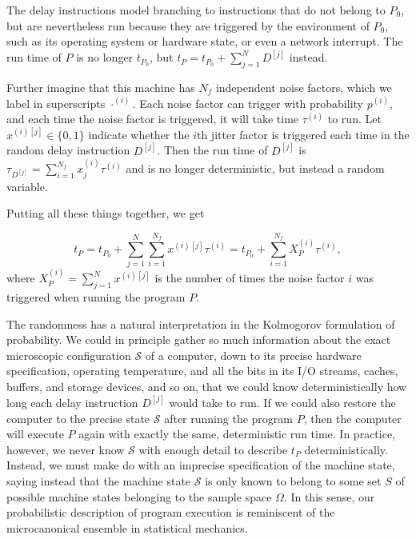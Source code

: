 \documentclass[conference]{IEEEtran}
\begin{document}
The delay instructions model branching to instructions that do not belong to $P_0$, but are nevertheless run because they are triggered by the environment of $P_0$, such as its operating system or hardware state, or even a network interrupt. The run time of $P$ is no longer $t_{P_0}$, but
$t_P = t_{P_0} + \sum_{j=1}^N D^{[j]}$ instead.

Further imagine that this machine has $N_f$ independent noise factors, which we label in superscripts $\cdot^{(i)}$. Each noise factor can trigger with probability $p^{(i)}$, and each time the noise factor is triggered, it will take time $\tau^{(i)}$ to run. Let $x^{(i)[j]} \in \{0, 1\}$ indicate whether the $i$th jitter factor is triggered each time in the random delay instruction $D^{[j]}$. Then the run time of $D^{[j]}$ is
$\tau_{D^{[j]}} = \sum_{i=1}^{N_f} x^{(i)}_j \tau^{(i)}$ and is no longer deterministic, but instead a random variable.

Putting all these things together, we get

\begin{equation}
t_P = t_{P_0} + \sum_{j=1}^N \sum_{i=1}^{N_f} x^{(i)[j]} \tau^{(i)}
= t_{P_0} + \sum_{i=1}^{N_f} X_P^{(i)} \tau^{(i)},
\end{equation}
%
where $X_P^{(i)} = \sum_{j=1}^N x^{(i)[j]}$ is the number of times the noise factor $i$ was triggered when running the program $P$.

The randomness has a natural interpretation in the Kolmogorov formulation of probability. We could in principle gather so much information about the exact microscopic configuration $\mathcal S$ of a computer, down to its precise hardware specification, operating temperature, and all the bits in its I/O streams, caches, buffers, and storage devices, and so on, that we could know deterministically how long each delay instruction $D^{[j]}$ would take to run. If we could also restore the computer to the precise state $\mathcal S$ after running the program $P$, then the computer will execute $P$ again with exactly the same, deterministic run time. In practice, however, we never know $\mathcal S$ with enough detail to describe $t_P$ deterministically. Instead, we must make do with an imprecise specification of the machine state, saying instead that the machine state $\mathcal S$ is only known to belong to some set $S$ of possible machine states belonging to the sample space $\Omega$. In this sense, our probabilistic description of program execution is reminiscent of the microcanonical ensemble in statistical mechanics.
\end{document}
